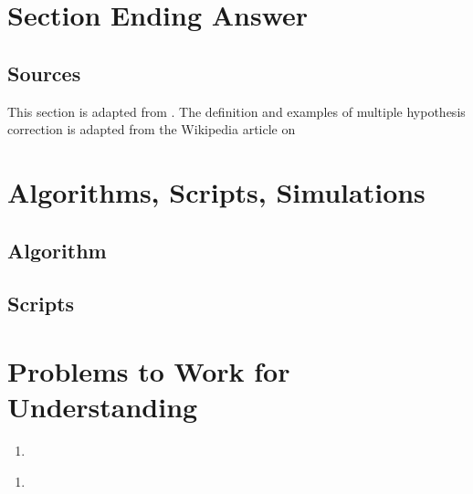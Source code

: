 \documentclass[12pt]{article}
\begin{document}
\section*{Section Ending Answer}

\subsection*{Sources}
This section is adapted from
\cite{doi:10.1080/2330443X.2020.1806763}.  The definition and examples
of multiple hypothesis correction is adapted from the Wikipedia
article on

\hr

\section*{Algorithms, Scripts, Simulations}

\subsection*{Algorithm}

\subsection*{Scripts}



\hr

\section*{Problems to Work for Understanding}
\renewcommand{\theexerciseseries}{}
\renewcommand{\theexercise}{\arabic{exercise}}

\begin{exercise}
  
\end{exercise}
\begin{solution}
  
\end{solution}
\begin{exercise}
  \begin{enumerate}[label=(\alpha*)]
  \item 
  \end{enumerate}
\end{exercise}
\begin{solution}
  \begin{enumerate}[label=(\alpha*)]
  \item 
  \end{enumerate}
\end{solution}
\end{document}
